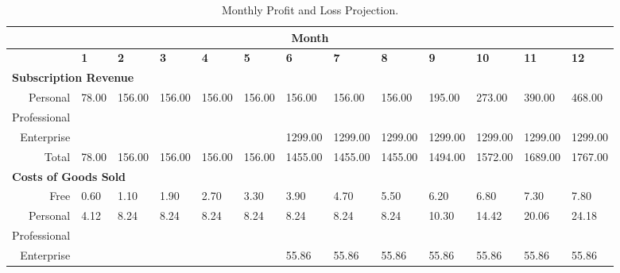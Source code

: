 \begin{sidewaystable}
\begin{table}[H]
  \caption{Monthly Profit and Loss Projection.}
  \setlength\tabcolsep{5pt}
  \def\arraystretch{1.2}%

  \begin{tabularx}{\textwidth}{X X X X X X X X X X X X X}

    \multicolumn{13}{c}{\textbf{Month}} \\

    \hline
    
    \multicolumn{1}{c}{} & \textbf{1} & \textbf{2} & \textbf{3} & \textbf{4} & \textbf{5} & \textbf{6} & \textbf{7} & \textbf{8} & \textbf{9} & \textbf{10} & \textbf{11} & \textbf{12}  \\

    \hline

    \multicolumn{13}{l}{\textbf{Subscription Revenue}} \\

    \hline

    \multicolumn{1}{r}{Personal} & 78.00 & 156.00 & 156.00 & 156.00  & 156.00  & 156.00  & 156.00  & 156.00  & 195.00  & 273.00  & 390.00  & 468.00  \\
    \multicolumn{1}{r}{Professional} &   &   &  &   &  &  &  &  &  &  &  &  \\
    \multicolumn{1}{r}{Enterprise} &  &  &  &  &  & 1299.00 & 1299.00 & 1299.00 & 1299.00 & 1299.00 & 1299.00 & 1299.00  \\

    \multicolumn{1}{r}{Total} & 78.00 & 156.00 & 156.00 & 156.00  & 156.00  & 1455.00  & 1455.00  & 1455.00  & 1494.00  & 1572.00  & 1689.00  & 1767.00  \\

    \hline

    \multicolumn{13}{l}{\textbf{Costs of Goods Sold}} \\

    \hline

    \multicolumn{1}{r}{Free} & 0.60 & 1.10  & 1.90 & 2.70 & 3.30 & 3.90 & 4.70 & 5.50 & 6.20 & 6.80 & 7.30 & 7.80  \\
    \multicolumn{1}{r}{Personal} & 4.12 & 8.24 & 8.24 & 8.24 & 8.24 & 8.24 & 8.24 & 8.24 & 10.30  & 14.42 & 20.06 & 24.18  \\
    \multicolumn{1}{r}{Professional} &  &  &  &  &  &  &  &  &  &  &  &   \\
    \multicolumn{1}{r}{Enterprise} &  &  &  &  &  & 55.86 & 55.86 & 55.86 & 55.86 & 55.86 & 55.86 & 55.86  \\


\end{tabularx}
\end{table}
\end{sidewaystable}
